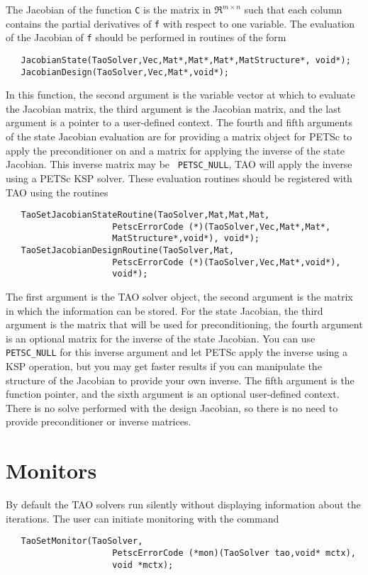 The Jacobian of the function {\tt C} is the matrix in $\Re^{m \times n}$
such that each column contains the partial derivatives of {\tt f} with respect
to one variable. 
The evaluation of the Jacobian of {\tt f} should be performed in routines
of the form
\begin{verbatim}
   JacobianState(TaoSolver,Vec,Mat*,Mat*,Mat*,MatStructure*, void*);
   JacobianDesign(TaoSolver,Vec,Mat*,void*);
\end{verbatim}
\noindent
In this function, the second argument is the variable vector at which to 
evaluate the Jacobian matrix, the third argument is the Jacobian matrix,
and the last argument is a pointer to a user-defined context. The fourth and
fifth arguments of the state Jacobian evaluation are for providing a matrix
object 
for PETSc to apply the preconditioner on and a matrix for applying
the inverse of the state Jacobian. This inverse matrix may be {\tt
  PETSC\_NULL},
TAO will apply the inverse using a PETSc KSP solver.
These evaluation routines should be registered with TAO using the routines
\begin{verbatim}
   TaoSetJacobianStateRoutine(TaoSolver,Mat,Mat,Mat,
                     PetscErrorCode (*)(TaoSolver,Vec,Mat*,Mat*,
                     MatStructure*,void*), void*);
   TaoSetJacobianDesignRoutine(TaoSolver,Mat,
                     PetscErrorCode (*)(TaoSolver,Vec,Mat*,void*), 
                     void*);
\end{verbatim}
\noindent
The first argument is the TAO solver object, the second
argument is the matrix in which the information can be stored.
For the state Jacobian, 
the third argument is the matrix that will be used for preconditioning,
the fourth argument is an optional matrix for the inverse of the state 
Jacobian.  You can use {\tt PETSC\_NULL} for this inverse argument and let 
PETSc apply the inverse using a KSP operation, but you may get faster
results if you can manipulate the structure of the Jacobian to provide your
own inverse. The fifth argument is the function pointer, and the sixth argument is
an optional user-defined context. There is no solve performed with the
design Jacobian, so there is no need to provide preconditioner or inverse
matrices.


\section{Monitors}

By default the TAO solvers run silently without displaying information
about the iterations. The user can initiate monitoring with the
command  
\begin{verbatim}
   TaoSetMonitor(TaoSolver,
                     PetscErrorCode (*mon)(TaoSolver tao,void* mctx),
                     void *mctx);
\end{verbatim}
\noindent

